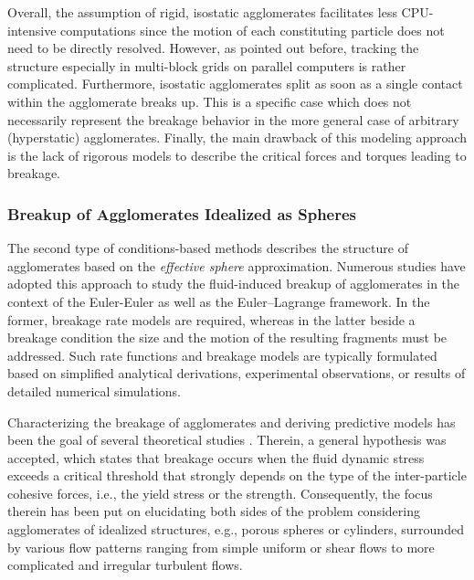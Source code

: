 Overall, the assumption of rigid, isostatic agglomerates facilitates
less CPU-intensive computations since the motion of each constituting
particle does not need to be directly resolved. However, as pointed
out before, tracking the structure especially in multi-block grids on
parallel computers is rather complicated. Furthermore, isostatic
agglomerates split as soon as a single contact within the agglomerate
breaks up.  This is a specific case which does not necessarily
represent the breakage behavior in the more general case of arbitrary
(hyperstatic) agglomerates.  Finally, the main drawback of this
modeling approach is the lack of rigorous models to describe the
critical forces and torques leading to breakage.

\subsubsection{Breakup of Agglomerates Idealized as Spheres}
\label{sec:break_fluid_sphere}

The second type of conditions-based methods describes the structure of
agglomerates based on the \emph{effective sphere} approximation.
Numerous studies have adopted this approach to study the fluid-induced
breakup of agglomerates in the context of the Euler-Euler as well as
the Euler--Lagrange framework. In the former, breakage rate models are
required, whereas in the latter beside a breakage condition the size
and the motion of the resulting fragments must be addressed. Such rate
functions and breakage models are typically formulated based on
simplified analytical derivations, experimental observations, or
results of detailed numerical simulations.

Characterizing the breakage of agglomerates and deriving predictive
models has been the goal of several theoretical studies
\citep[e.g.,][]{rumpf1932desagglomeration,thomas1964turbulent,
  tomi1978behaviour,sonntag1987structure2,zaccone2009}. Therein, a
general hypothesis was accepted, which states that breakage occurs
when the fluid dynamic stress exceeds a critical threshold that
strongly depends on the type of the inter-particle cohesive forces,
i.e., the yield stress or the strength.  Consequently, the focus
therein has been put on elucidating both sides of the problem
considering agglomerates of idealized structures, e.g., porous spheres
or cylinders, surrounded by various flow patterns ranging from simple
uniform or shear flows to more complicated and irregular turbulent
flows. \newline

